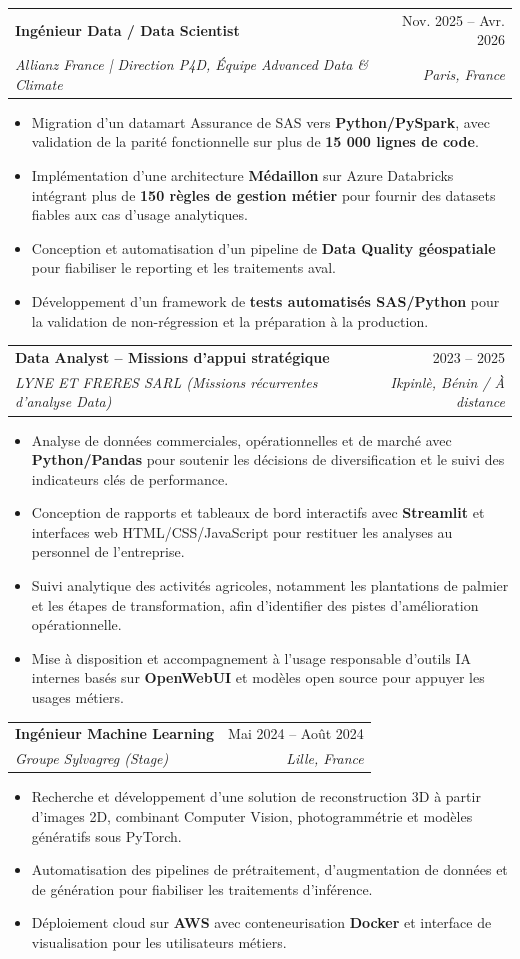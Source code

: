 \documentclass[letterpaper,11pt]{article}
\makeatletter
\newcommand{\resumeItem}[1]{
  \item\small{{#1 \vspace{-1.5pt}}}
}
\newcommand{\resumeSubheading}[4]{
  \vspace{1pt}\item
    \begin{tabular*}{0.97\textwidth}[t]{l@{\extracolsep{\fill}}r}
      {\color{primary}\textbf{#1}} & #2 \\
      \textit{\small#3} & \textit{\small #4} \\
    \end{tabular*}\vspace{-4pt}
}
\newcommand{\resumeItemListStart}{\begin{itemize}[leftmargin=0.15in, label={\small\textbullet}, itemsep=1.5pt, parsep=0pt, topsep=2pt, partopsep=0pt]}
\newcommand{\resumeItemListEnd}{\end{itemize}\vspace{-1pt}}
\makeatother
\begin{document}
\resumeSubheading
{Ingénieur Data / Data Scientist}{Nov. 2025 -- Avr. 2026}
{Allianz France | Direction P4D, Équipe Advanced Data \& Climate}{Paris, France}
\resumeItemListStart
  \resumeItem{Migration d'un datamart Assurance de SAS vers \textbf{Python/PySpark}, avec validation de la parité fonctionnelle sur plus de \textbf{15 000 lignes de code}.}
  \resumeItem{Implémentation d'une architecture \textbf{Médaillon} sur Azure Databricks intégrant plus de \textbf{150 règles de gestion métier} pour fournir des datasets fiables aux cas d'usage analytiques.}
  \resumeItem{Conception et automatisation d'un pipeline de \textbf{Data Quality géospatiale} pour fiabiliser le reporting et les traitements aval.}
  \resumeItem{Développement d'un framework de \textbf{tests automatisés SAS/Python} pour la validation de non-régression et la préparation à la production.}
\resumeItemListEnd

\resumeSubheading
{Data Analyst -- Missions d'appui stratégique}{2023 -- 2025}
{LYNE ET FRERES SARL \normalfont\small(Missions récurrentes d'analyse Data)}{Ikpinlè, Bénin / À distance}
\resumeItemListStart
  \resumeItem{Analyse de données commerciales, opérationnelles et de marché avec \textbf{Python/Pandas} pour soutenir les décisions de diversification et le suivi des indicateurs clés de performance.}
  \resumeItem{Conception de rapports et tableaux de bord interactifs avec \textbf{Streamlit} et interfaces web HTML/CSS/JavaScript pour restituer les analyses au personnel de l'entreprise.}
  \resumeItem{Suivi analytique des activités agricoles, notamment les plantations de palmier et les étapes de transformation, afin d'identifier des pistes d'amélioration opérationnelle.}
  \resumeItem{Mise à disposition et accompagnement à l'usage responsable d'outils IA internes basés sur \textbf{OpenWebUI} et modèles open source pour appuyer les usages métiers.}
\resumeItemListEnd

\resumeSubheading
{Ingénieur Machine Learning}{Mai 2024 -- Août 2024}
{Groupe Sylvagreg \normalfont\small(Stage)}{Lille, France} 
\resumeItemListStart
  \resumeItem{Recherche et développement d'une solution de reconstruction 3D à partir d'images 2D, combinant Computer Vision, photogrammétrie et modèles génératifs sous PyTorch.}
  \resumeItem{Automatisation des pipelines de prétraitement, d'augmentation de données et de génération pour fiabiliser les traitements d'inférence.}
  \resumeItem{Déploiement cloud sur \textbf{AWS} avec conteneurisation \textbf{Docker} et interface de visualisation pour les utilisateurs métiers.}
\resumeItemListEnd
\end{document}

